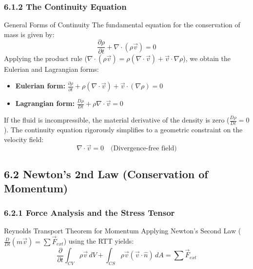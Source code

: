 \subsubsection{6.1.2 The Continuity Equation}
\begin{resultboxnamed}{General Forms of Continuity}
The fundamental equation for the conservation of mass is given by:
\begin{equation*}
    \frac{\partial \rho}{\partial t} + \nabla \cdot (\rho \vec{v}) = 0
\end{equation*}
Applying the product rule ($\nabla \cdot (\rho \vec{v}) = \rho (\nabla \cdot \vec{v}) + \vec{v} \cdot \nabla \rho$), we obtain the Eulerian and Lagrangian forms:
\begin{itemize}
    \item \textbf{Eulerian form:} $\displaystyle \frac{\partial \rho}{\partial t} + \rho (\nabla \cdot \vec{v}) + \vec{v} \cdot (\nabla \rho) = 0$
    \item \textbf{Lagrangian form:} $\displaystyle \frac{D\rho}{Dt} + \rho \nabla \cdot \vec{v} = 0$
\end{itemize}
\end{resultboxnamed}

\begin{expertbox}
If the fluid is incompressible, the material derivative of the density is zero ($\frac{D\rho}{Dt} = 0$). The continuity equation rigorously simplifies to a geometric constraint on the velocity field:
\begin{equation*}
    \nabla \cdot \vec{v} = 0 \quad \text{(Divergence-free field)}
\end{equation*}
\end{expertbox}

\subsection{6.2 Newton's 2nd Law (Conservation of Momentum)}

\subsubsection{6.2.1 Force Analysis and the Stress Tensor}
\begin{eqbox}{Reynolds Transport Theorem for Momentum}
Applying Newton's Second Law ($\frac{D}{Dt}(m\vec{v}) = \sum \vec{F}_{ext}$) using the RTT yields:
\begin{equation*}
    \frac{\partial}{\partial t} \int_{CV} \rho \vec{v} \, dV + \int_{CS} \rho \vec{v} (\vec{v} \cdot \hat{n}) \, dA = \sum \vec{F}_{ext}
\end{equation*}
\end{eqbox}

